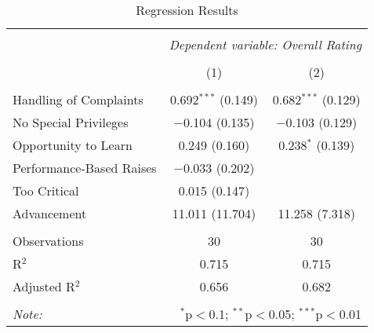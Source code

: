 \documentclass[11pt]{article}
\begin{document}
\begin{table}[tb] 
    \caption{Regression Results} 
    \label{reg1}
    \centering 
    
    \begin{tabular}{@{\extracolsep{5pt}}lcc} 
    \hline 
    \hline \\[-1.8ex] 
    & \multicolumn{2}{c}{\textit{Dependent variable: Overall Rating}} \\ 
    \cline{2-3} 
    \\[-1.8ex] & (1) & (2)\\ 
    \hline \\[-1.8ex] 
    Handling of Complaints & 0.692$^{***}$ (0.149) & 0.682$^{***}$ (0.129) \\ 
    No Special Privileges & $-$0.104 (0.135) & $-$0.103 (0.129) \\ 
    Opportunity to Learn & 0.249 (0.160) & 0.238$^{*}$ (0.139) \\ 
    Performance-Based Raises & $-$0.033 (0.202) &  \\ 
    Too Critical & 0.015 (0.147) &  \\ 
    Advancement & 11.011 (11.704) & 11.258 (7.318) \\ 
    \hline \\[-1.8ex] 
    Observations & 30 & 30 \\ 
    R$^{2}$ & 0.715 & 0.715 \\ 
    Adjusted R$^{2}$ & 0.656 & 0.682 \\ 
    \hline 
    \hline \\[-1.8ex] 
    \textit{Note:}  & \multicolumn{2}{r}{$^{*}$p$<$0.1; $^{**}$p$<$0.05; $^{***}$p$<$0.01} \\ 
    \end{tabular} 
\end{table}


\newpage~\newpage
\printbibliography
\end{document}
